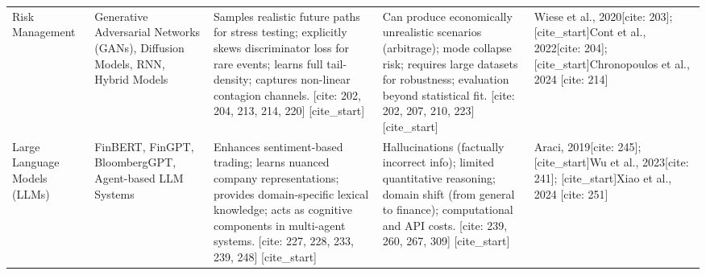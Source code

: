 \begin{table}[htbp]
\begin{tabularx}{\textwidth}{>{\RaggedRight}X >{\RaggedRight}X >{\RaggedRight}X >{\RaggedRight}X >{\RaggedRight\arraybackslash}X}
Risk Management & Generative Adversarial Networks (GANs), Diffusion Models, RNN, Hybrid Models & Samples realistic future paths for stress testing; explicitly skews discriminator loss for rare events; learns full tail-density; captures non-linear contagion channels. [cite: 202, 204, 213, 214, 220] [cite_start]& Can produce economically unrealistic scenarios (arbitrage); mode collapse risk; requires large datasets for robustness; evaluation beyond statistical fit. [cite: 202, 207, 210, 223] [cite_start]& Wiese et al., 2020[cite: 203]; [cite_start]Cont et al., 2022[cite: 204]; [cite_start]Chronopoulos et al., 2024 [cite: 214] \\
Large Language Models (LLMs) & FinBERT, FinGPT, BloombergGPT, Agent-based LLM Systems & Enhances sentiment-based trading; learns nuanced company representations; provides domain-specific lexical knowledge; acts as cognitive components in multi-agent systems. [cite: 227, 228, 233, 239, 248] [cite_start]& Hallucinations (factually incorrect info); limited quantitative reasoning; domain shift (from general to finance); computational and API costs. [cite: 239, 260, 267, 309] [cite_start]& Araci, 2019[cite: 245]; [cite_start]Wu et al., 2023[cite: 241]; [cite_start]Xiao et al., 2024 [cite: 251] \\

\bottomrule
\end{tabularx}
\end{table}